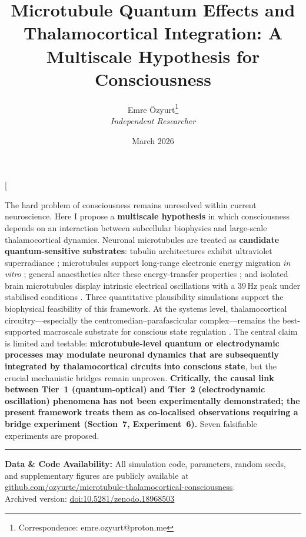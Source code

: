 \documentclass[10pt, a4paper, twocolumn]{article}
\title{\textbf{Microtubule Quantum Effects and Thalamocortical
Integration: A Multiscale Hypothesis for Consciousness}}
\author{Emre \"Ozyurt\thanks{Correspondence: emre.ozyurt@proton.me} \\
\textit{Independent Researcher}}
\date{March 2026}
\renewcommand{\abstracttextfont}{\normalfont\small}
\begin{document}
\twocolumn[
  \begingroup
  \maketitle
  \renewcommand{\abstracttextfont}{\normalfont\small}
  \setlength{\absleftindent}{1.5cm}
  \setlength{\absrightindent}{1.5cm}
  \begin{onecolabstract}
The hard problem of consciousness remains unresolved within current
neuroscience. Here I propose a \textbf{multiscale hypothesis} in which
consciousness depends on an interaction between subcellular biophysics
and large-scale thalamocortical dynamics. Neuronal microtubules are
treated as \textbf{candidate quantum-sensitive substrates}: tubulin
architectures exhibit ultraviolet superradiance \cite{babcock2024};
microtubules support long-range electronic energy migration
\emph{in vitro} \cite{kalra2023}; general anaesthetics alter these
energy-transfer properties \cite{craddock2017}; and isolated brain
microtubules display intrinsic electrical oscillations with a 39\,Hz
peak under stabilised conditions
\cite{cantero2018,cantero2023,scarinci2023,marucho2025}. Three
quantitative plausibility simulations support the biophysical
feasibility of this framework. At the systems level, thalamocortical
circuitry---especially the centromedian--parafascicular complex---remains
the best-supported macroscale substrate for conscious state regulation
\cite{cacciatore2025,schiff2007,casali2013}. The central claim is
limited and testable: \textbf{microtubule-level quantum or
electrodynamic processes may modulate neuronal dynamics that are
subsequently integrated by thalamocortical circuits into conscious
state}, but the crucial mechanistic bridges remain unproven.
\textbf{Critically, the causal link between Tier~1 (quantum-optical)
and Tier~2 (electrodynamic oscillation) phenomena has not been
experimentally demonstrated; the present framework treats them as
co-localised observations requiring a bridge experiment
(Section~7, Experiment~6).}
Seven falsifiable experiments are proposed.
  \end{onecolabstract}
  \endgroup
  \vspace{1.5em}

  \noindent\rule{\textwidth}{0.4pt}
  \vspace{0.3em}

  \noindent\textbf{Data \& Code Availability:}
  All simulation code, parameters, random seeds, and
  supplementary figures are publicly available at
  \href{https://github.com/ozyurte/microtubule-thalamocortical-consciousness}
  {github.com/ozyurte/microtubule-thalamocortical-consciousness}.
   \\Archived version:
  \href{https://doi.org/10.5281/zenodo.18968503}
  {doi:10.5281/zenodo.18968503}
\end{document}
